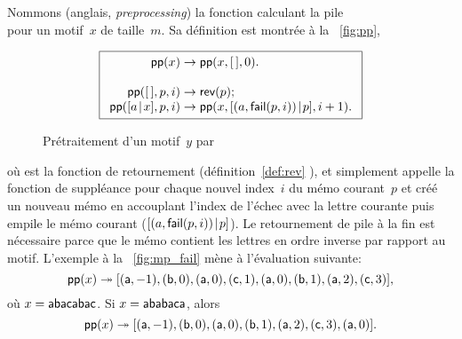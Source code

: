 Nommons  (anglais,
\emph{preprocessing}) la fonction calculant la pile
\begin{equation*}
[\pair{\ind{x}{0}}{\MPfailure{x}{}{0}},
\pair{\ind{x}{1}}{\MPfailure{x}{}{1}}, \dots,
\pair{\ind{x}{m-1}}{\MPfailure{x}{}{m-1}}]
\end{equation*}
pour un motif~\(x\) de taille~\(m\). Sa définition est montrée à la
\fig~\vref{fig:pp},
\begin{figure}[t]
\begin{equation*}
\boxed{%
\begin{array}{r@{\;}l@{\;}l}
\fun{pp}(x) & \rightarrow & \fun{pp}(x,\el,0).\\
\\
\fun{pp}(\el,p,i) & \rightarrow & \fun{rev}(p);\\
\fun{pp}(\cons{a}{x},p,i)
  & \rightarrow
  & \fun{pp}(x,\cons{\pair{a}{\fun{fail}(p,i)}}{p},i+1).
\end{array}}
\end{equation*}
\caption{Prétraitement d'un motif~\(y\) par }
\label{fig:pp}
\end{figure}
où  est la fonction de retournement
(définition~\eqref{def:rev} ), et
 simplement appelle la fonction de
suppléance  pour chaque nouvel index~\(i\) du mémo
courant~\(p\) et créé un nouveau mémo en accouplant l'index de l'échec
avec la lettre courante puis empile le mémo courant
(\([{({a},{\textsf{fail}(p,i)})}\!\mid\!{p}]\)). Le retournement de pile à
la fin est nécessaire parce que le mémo contient les lettres en ordre
inverse par rapport au motif. L'exemple à la \fig~\vref{fig:mp_fail}
mène à l'évaluation suivante:
\begin{equation*}
\textsf{pp}(x) \twoheadrightarrow
[({\textsf{a}},{-1}), ({\textsf{b}},{0}),
({\textsf{a}},{0}), ({\textsf{c}},{1}),
({\textsf{a}},{0}), ({\textsf{b}},{1}),
({\textsf{a}},{2}), ({\textsf{c}},{3})],
\end{equation*}
où \(x=\textsf{abacabac}\). Si \(x=\textsf{ababaca}\), alors
\begin{equation*}
\abovedisplayskip=2pt
\belowdisplayskip=0pt
\fun{pp}(x) \twoheadrightarrow
[\pair{\word{a}}{-1}, \pair{\word{b}}{0},
\pair{\word{a}}{0}, \pair{\word{b}}{1},
\pair{\word{a}}{2}, \pair{\word{c}}{3},
\pair{\word{a}}{0}].
\end{equation*}


